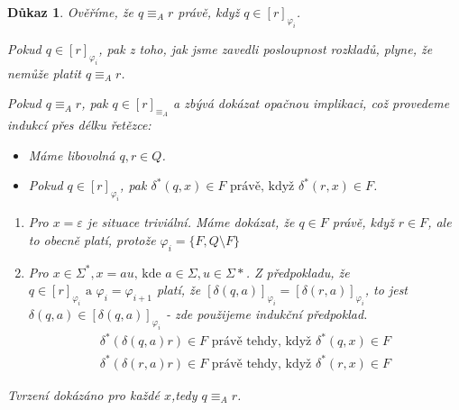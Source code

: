 \documentclass[10pt, a4paper, titlepage]{article}
\theoremstyle{note}
\newtheorem{dukaz}{\textbf{Důkaz}}
\begin{document}
\begin{dukaz}
Ověříme, že $q \equiv_{A} r$ právě, když $q \in [r]_{\varphi_{i}}$.

Pokud $q \in [r]_{\varphi_{i}}$, pak z toho, jak jsme zavedli
posloupnost rozkladů, plyne, že nemůže platit $q \equiv_{A} r$.

Pokud $q \equiv_{A} r$, pak $q \in [r]_{\equiv_{A}}$ a zbývá dokázat opačnou implikaci, což provedeme indukcí přes délku řetězce:
\begin{itemize}
\item
Máme libovolná $q, r \in Q$.

\item Pokud $q \in [r]_{\varphi_{i}}$, pak $\delta^{*}(q,x) \in F \text{ právě, když } \delta^{*}(r, x) \in F$.
\end{itemize}
\begin{enumerate}
\item
Pro $x = \varepsilon$ je situace triviální.
Máme dokázat, že $q \in F$ právě, když $r \in F$, ale to obecně platí, protože $\varphi_{i} = \lbrace F, Q \setminus F \rbrace$
\item
Pro $x \in \Sigma^{*}, x = au \text{, kde } a \in \Sigma, u \in \Sigma{*}$.
Z předpokladu, že $q \in [r]_{\varphi_{i}} \text{ a } \varphi_{i} =\varphi_{i+1}$ platí, že $[\delta(q, a)]_{\varphi_{i}} = [\delta(r, a)]_{\varphi_{i}}$,
to jest $\delta(q, a) \in [\delta(q, a)]_{\varphi_{i}}$ - zde použijeme indukční předpoklad.
\begin{gather*}
\delta^{*}(\delta(q,a)r) \in F \text{ pr\'avě tehdy, když } \delta^{*}(q,x) \in F \\
\delta^{*}(\delta(r,a)r) \in F \text{ pr\'avě tehdy, když } \delta^{*}(r,x) \in F
\end{gather*}
\end{enumerate}

Tvrzen\'i dok\'az\'ano pro každ\'e $x$,tedy $q \equiv_{A} r$.
\end{dukaz}
\end{document}
